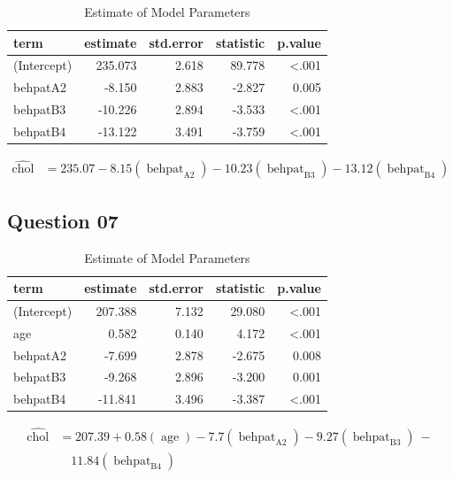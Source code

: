 \documentclass[
  12pt,
  oneside]{article}
\begin{document}
\begin{table}[H]

\caption{\label{tab:Table-07}Estimate of Model Parameters}
\centering
\begin{tabular}[t]{lrrrr}
\toprule
term & estimate & std.error & statistic & p.value\\
\midrule
(Intercept) & 235.073 & 2.618 & 89.778 & <.001\\
behpatA2 & -8.150 & 2.883 & -2.827 & 0.005\\
behpatB3 & -10.226 & 2.894 & -3.533 & <.001\\
behpatB4 & -13.122 & 3.491 & -3.759 & <.001\\
\bottomrule
\end{tabular}
\end{table}

\begin{equation}
\begin{aligned}
\operatorname{\widehat{chol}} &= 235.07 - 8.15(\operatorname{behpat}_{\operatorname{A2}}) - 10.23(\operatorname{behpat}_{\operatorname{B3}}) - 13.12(\operatorname{behpat}_{\operatorname{B4}})
\end{aligned}
\end{equation}

\hypertarget{question-07}{%
\subsection{Question 07}\label{question-07}}

\begin{table}[H]

\caption{\label{tab:Table-08}Estimate of Model Parameters}
\centering
\begin{tabular}[t]{lrrrr}
\toprule
term & estimate & std.error & statistic & p.value\\
\midrule
(Intercept) & 207.388 & 7.132 & 29.080 & <.001\\
age & 0.582 & 0.140 & 4.172 & <.001\\
behpatA2 & -7.699 & 2.878 & -2.675 & 0.008\\
behpatB3 & -9.268 & 2.896 & -3.200 & 0.001\\
behpatB4 & -11.841 & 3.496 & -3.387 & <.001\\
\bottomrule
\end{tabular}
\end{table}

\begin{equation}
\begin{aligned}
\operatorname{\widehat{chol}} &= 207.39 + 0.58(\operatorname{age}) - 7.7(\operatorname{behpat}_{\operatorname{A2}}) - 9.27(\operatorname{behpat}_{\operatorname{B3}})\ - \\
&\quad 11.84(\operatorname{behpat}_{\operatorname{B4}})
\end{aligned}
\end{equation}
\end{document}
